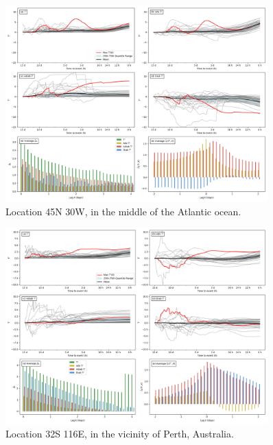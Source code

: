 \begin{figure}[h]
\caption{Location 45N 30W, in the middle of the Atlantic ocean.}
\centering
\includegraphics[width=0.9\textwidth]{images/sup2.png}
\end{figure}

\begin{figure}[h]
\caption{Location 32S 116E, in the vicinity of Perth, Australia.}
\centering
\includegraphics[width=0.9\textwidth]{images/sup3.png}
\end{figure}

